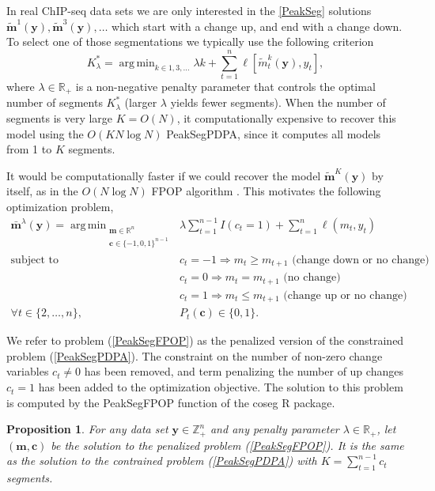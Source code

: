 \documentclass{article}
\newtheorem{Proposition}{Proposition}
\DeclareMathOperator*{\argmin}{arg\,min}
\newcommand{\ZZ}{\mathbb Z}
\newcommand{\RR}{\mathbb R}
\begin{document}
In real ChIP-seq data sets we are only interested in the \ref{PeakSeg}
solutions
$\mathbf{\tilde m}^1(\mathbf y), \mathbf{\tilde m}^3(\mathbf y), \dots$
which start with a change up, and end with a change down. To select
one of those segmentations we typically use the following criterion
\begin{equation}
  \label{eq:selection}
  K^*_\lambda = \argmin_{k\in 1,3, \dots}
  \lambda k +
\sum_{t=1}^n
  \ell[ \tilde m_t^k(\mathbf y),  y_t ],
\end{equation}
where $\lambda\in\RR_+$ is a non-negative penalty parameter 
that controls the optimal number of segments $K^*_\lambda$
(larger $\lambda$ yields fewer segments).
When the number of segments is very large $K =O(N)$, 
it computationally expensive to recover this model
using the $O(K N\log N)$ PeakSegPDPA, 
since it computes all models from 1 to $K$ segments.

It would be computationally faster if we could recover the model
$\mathbf{\tilde m}^{K}(\mathbf y)$ by itself, as in the $O(N\log N)$
FPOP algorithm \citep{johnson, FPOP}. This motivates the following
optimization problem,
\begin{align}
  \mathbf{\bar m}^\lambda(\mathbf y) =
    \argmin_{\substack{
  \mathbf m\in\RR^{n}
\\
  \mathbf c\in\{-1,0,1\}^{n-1}
  }} &\ \ 
\lambda\sum_{t=1}^{n-1} I(c_t =1)
+
\sum_{t=1}^n \ell( m_t,  y_t) 
  \label{PeakSegFPOP}
\\
    \text{subject to} 
& \ \ c_t = -1 \Rightarrow m_{t} \geq m_{t+1} \text{ (change down or no change)}
\nonumber\\
& \ \ c_t = 0 \Rightarrow m_{t} = m_{t+1}  \text{ (no change)}
\nonumber\\
& \ \ c_t = 1 \Rightarrow m_{t} \leq m_{t+1} \text{ (change up or no change)}
\nonumber\\
\forall t\in\{2, \dots, n\}, &\ \ P_t(\mathbf c) \in\{0, 1\}.
\nonumber
\end{align}

We refer to problem (\ref{PeakSegFPOP}) as the penalized version of
the constrained problem (\ref{PeakSegPDPA}). The constraint on the
number of non-zero change variables $c_t\neq 0$ has been removed, and
term penalizing the number of up changes $c_t=1$ has been added to the
optimization objective.  The solution to this problem is computed by
the PeakSegFPOP function of the coseg R package.

\begin{Proposition}
  For any data set $\mathbf y\in\ZZ_+^n$ and any penalty parameter
  $\lambda\in\RR_+$, let $(\mathbf m,\mathbf c)$ be the solution to
  the penalized problem (\ref{PeakSegFPOP}). It is the same as the
  solution to the contrained problem (\ref{PeakSegPDPA}) with
  $K=\sum_{t=1}^{n-1} c_t$ segments.
\end{Proposition}
\end{document}
